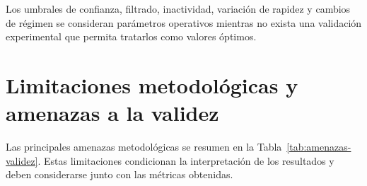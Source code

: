 Los umbrales de confianza, filtrado, inactividad, variación de rapidez y cambios de régimen se consideran parámetros operativos mientras no exista una validación experimental que permita tratarlos como valores óptimos.

\section{Limitaciones metodológicas y amenazas a la validez}

Las principales amenazas metodológicas se resumen en la Tabla~\ref{tab:amenazas-validez}. Estas limitaciones condicionan la interpretación de los resultados y deben considerarse junto con las métricas obtenidas.

\begingroup
\footnotesize
\renewcommand{\arraystretch}{1.12}
\setlength{\tabcolsep}{3.5pt}
\setlength{\LTleft}{0pt}
\setlength{\LTright}{\fill}
